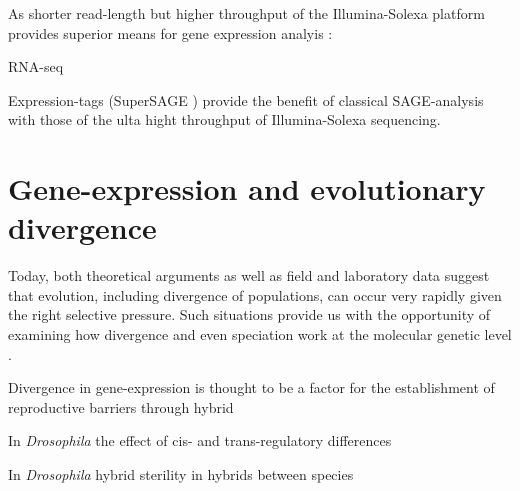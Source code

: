 As shorter read-length but higher throughput of the Illumina-Solexa
platform provides superior means for gene expression analyis
\cite{pmid21627854}:

RNA-seq \cite{pmid19015660}

Expression-tags (SuperSAGE \cite{pmid20967605}) provide the benefit of
classical SAGE-analysis \cite{pmid7570003} with those of the ulta
hight throughput of Illumina-Solexa sequencing.


\section{Gene-expression and evolutionary divergence}

Today, both theoretical arguments as well as field and laboratory data
suggest that evolution, including divergence of populations, can occur
very rapidly given the right selective pressure. Such situations
provide us with the opportunity of examining how divergence and even
speciation work at the molecular genetic level
\cite{via_ecological_2002} .

Divergence in gene-expression is thought to be a factor for the
establishment of reproductive barriers through hybrid

In \textit{Drosophila} the effect of cis- and trans-regulatory
differences \cite{pmid20354124}

In \textit{Drosophila} hybrid sterility in hybrids between species
\cite{pmid16757655}




     